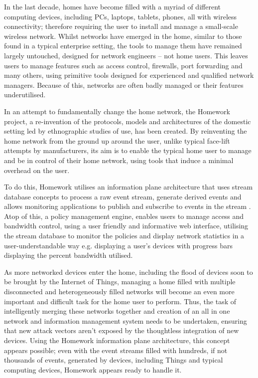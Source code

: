 In the last decade, homes have become filled with a myriad of different computing devices, including PCs, laptops, tablets, phones, all with wireless connectivity; therefore requiring the user to install and manage a small-scale wireless network. Whilst networks have emerged in the home, similar to those found in a typical enterprise setting, the tools to manage them have remained largely untouched, designed for network engineers -- not home users. This leaves users to manage features such as access control, firewalls, port forwarding and many others, using primitive tools designed for experienced and qualified network managers. Because of this, networks are often badly managed or their features underutilised.

In an attempt to fundamentally change the home network, the Homework project\cite{Homework, HomeworkControl}, a re-invention of the protocols, models and architectures of the domestic setting led by ethnographic studies of use, has been created. By reinventing the home network from the ground up around the user, unlike typical face-lift attempts by manufacturers, its aim is to enable the typical home user to manage and be in control of their home network, using tools that induce a minimal overhead on the user. 

To do this, Homework utilises an information plane architecture that uses stream database concepts to process a raw event stream, generate derived events and allows monitoring applications to publish and subscribe to events in the stream \cite{InformationPlane}. Atop of this, a policy management engine, enables users to manage access and bandwidth control, using a user friendly and informative web interface, utilising the stream database to monitor the policies and display network statistics in a user-understandable way e.g. displaying a user's devices with progress bars displaying the percent bandwidth utilised.

As more networked devices enter the home, including the flood of devices soon to be brought by the Internet of Things, managing a home filled with multiple disconnected and heterogeneously filled networks will become an even more important and difficult task for the home user to perform. Thus, the task of intelligently merging these networks together and creation of an all in one network and information management system needs to be undertaken, ensuring that new attack vectors aren't exposed by the thoughtless integration of new devices. Using the Homework information plane architecture, this concept appears possible; even with the event streams filled with hundreds, if not thousands of events, generated by devices, including Things and typical computing devices, Homework appears ready to handle it\cite{DEBSChallenge}.